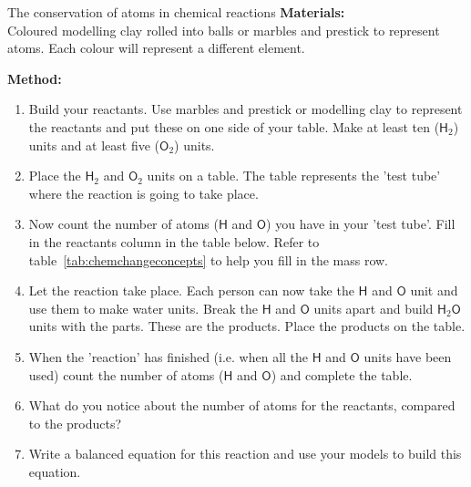             \begin{activity}{The conservation of atoms in chemical reactions }
            \nopagebreak
            \label{m38711*id64844}\noindent
\textbf{Materials:} \\ Coloured modelling clay rolled into balls or marbles and prestick to represent atoms. Each colour will represent a different element.
        \par 
      \label{m38711*id64882}\noindent
\textbf{Method:}\\
      \label{m38711*id64889}\begin{enumerate}[noitemsep, label=\textbf{\arabic*}. ] 
\label{m38711*uid36}\item Build your reactants. Use marbles and prestick or modelling clay to represent the reactants and put these on one side of your table. Make at least ten ($\mathsf{H}_{2}$) units and at least five ($\mathsf{O}_{2}$) units.
\label{m38711*uid37}\item Place the $\mathsf{H}_{2}$ and $\mathsf{O}_{2}$ units on a table. The table represents the 'test tube' where the reaction is going to take place. 
\label{m38711*uid38}\item Now count the number of atoms ($\mathsf{H}$ and $\mathsf{O}$) you have in your 'test tube'. Fill in the reactants column in the table below. Refer to table~\ref{tab:chemchangeconcepts} to help you fill in the mass row.
\label{m38711*uid39}\item Let the reaction take place. Each person can now take the $\mathsf{H}$ and $\mathsf{O}$ unit and use them to make water units. Break the $\mathsf{H}$ and $\mathsf{O}$ units apart and build $\mathsf{H}_{2}\mathsf{O}$ units with the parts. These are the products. Place the products on the table.
\item When the 'reaction' has finished (i.e. when all the $\mathsf{H}$ and $\mathsf{O}$ units have been used) count the number of atoms ($\mathsf{H}$ and $\mathsf{O}$) and complete the table.
\item What do you notice about the number of atoms for the reactants, compared to the products?
\item Write a balanced equation for this reaction and use your models to build this equation.
\end{enumerate}
        \par 
\begin{table}[H]
 \begin{center}
  \begin{tabular}{|l|l||l|} \hline

\end{tabular}
\end{center}
\end{table}
\end{activity}
